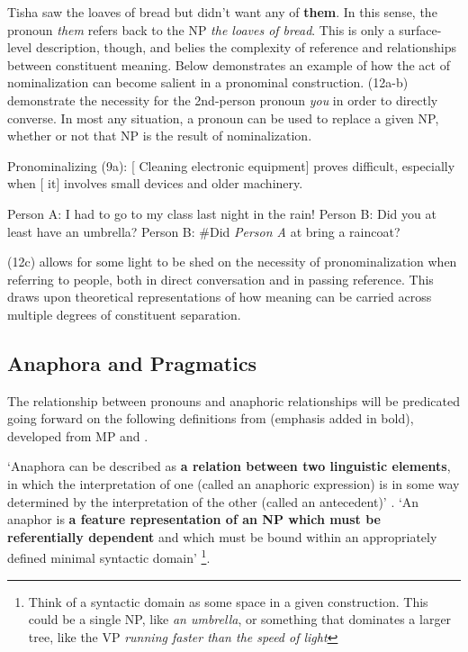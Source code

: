 \documentclass{article}
\begin{document}
\ea \label{prons}
    Tisha saw the loaves of bread but didn't want any of \textbf{them}.
\z
In this sense, the pronoun \textit{them} refers back to the NP \textit{the loaves of bread}. This is only a surface-level description, though, and belies the complexity of reference and relationships between constituent meaning. Below demonstrates an example of how the act of nominalization can become salient in a pronominal construction. (12a-b) demonstrate the necessity for the 2nd-person pronoun \textit{you} in order to directly converse. In most any situation, a pronoun can be used to replace a given NP, whether or not that NP is the result of nominalization.

\ea \label{gerundpro} Pronominalizing (9a):
    [ Cleaning electronic equipment] proves difficult, especially when [ it] involves small devices and older machinery.
\z

\ea \label{prons}
    \begin{xlist}
        \ex Person A: I had to go to my class last night in the rain!
        \ex Person B: Did you at least have an umbrella?        
        \ex Person B: \#Did \textit{Person A} at bring a raincoat?
    \end{xlist}
\z

(12c) allows for some light to be shed on the necessity of pronominalization when referring to people, both in direct conversation and in passing reference. This draws upon theoretical representations of how meaning can be carried across multiple degrees of constituent separation. 

\subsection{Anaphora and Pragmatics}

The relationship between pronouns and anaphoric relationships will be predicated going forward on the following definitions from \citet{Huang13} (emphasis added in bold), developed from MP and \citet{Chomsky95}.

\ea \label{test}
     \begin{xlist}
         \ex `Anaphora can be described as \textbf{a relation between two linguistic elements}, in which the interpretation of one (called an anaphoric expression) is in some way determined by the interpretation of the other (called an antecedent)' \citep[p.~73]{Huang13}.
         \ex `An anaphor is \textbf{a feature representation of an NP which must be referentially dependent} and which must be bound within an appropriately defined minimal syntactic domain' \citep[p.~74]{Huang13}\footnote{Think of a syntactic domain as some space in a given construction. This could be a single NP, like \textit{an umbrella}, or something that dominates a larger tree, like the VP \textit{running faster than the speed of light}}.
     \end{xlist} 
\z
\end{document}
